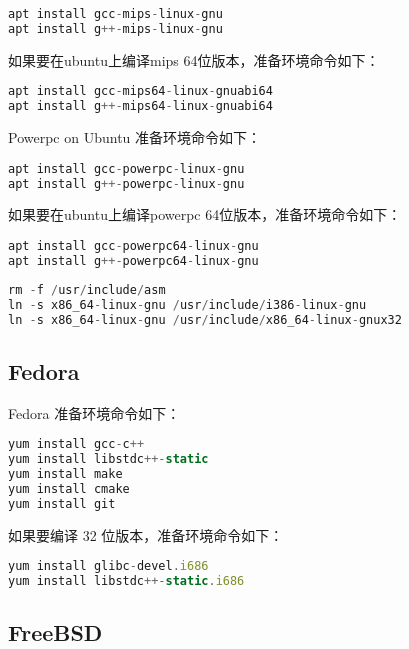 \begin{lstlisting}[language=JavaScript]
apt install gcc-mips-linux-gnu
apt install g++-mips-linux-gnu
\end{lstlisting}


如果要在ubuntu上编译mips 64位版本，准备环境命令如下：


\begin{lstlisting}[language=JavaScript]
apt install gcc-mips64-linux-gnuabi64
apt install g++-mips64-linux-gnuabi64
\end{lstlisting}

Powerpc on Ubuntu 准备环境命令如下：


\begin{lstlisting}[language=JavaScript]
apt install gcc-powerpc-linux-gnu
apt install g++-powerpc-linux-gnu
\end{lstlisting}


如果要在ubuntu上编译powerpc 64位版本，准备环境命令如下：



\begin{lstlisting}[language=JavaScript]
apt install gcc-powerpc64-linux-gnu
apt install g++-powerpc64-linux-gnu
\end{lstlisting}




\begin{lstlisting}[language=JavaScript]
rm -f /usr/include/asm
ln -s x86_64-linux-gnu /usr/include/i386-linux-gnu
ln -s x86_64-linux-gnu /usr/include/x86_64-linux-gnux32
\end{lstlisting}



\subsection{Fedora}

Fedora 准备环境命令如下：

\begin{lstlisting}[language=JavaScript]
yum install gcc-c++
yum install libstdc++-static
yum install make
yum install cmake
yum install git
\end{lstlisting}

如果要编译 32 位版本，准备环境命令如下：


\begin{lstlisting}[language=JavaScript]
yum install glibc-devel.i686
yum install libstdc++-static.i686
\end{lstlisting}

\subsection{FreeBSD}


